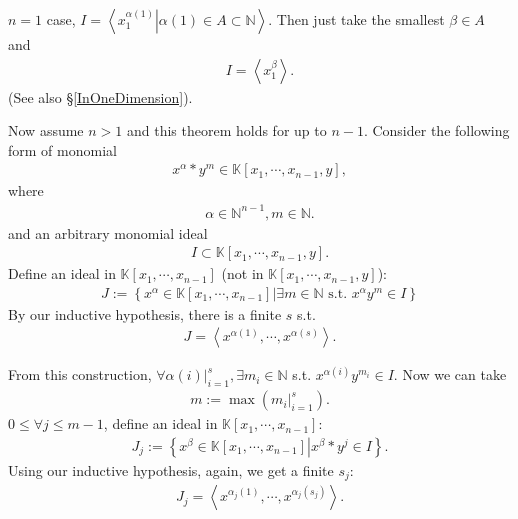 \documentclass[11pt]{book}
\begin{document}
$n=1$ case, $I = \left<\left. x_1^{\alpha(1)} \right| {\alpha(1)} \in A \subset \mathbb{N} \right>$.
Then just take the smallest $\beta \in A$ and 
\begin{eqnarray}
I = \left< x_1^\beta \right>.
\end{eqnarray}
(See also \S\ref{InOneDimension}).

Now assume $n>1$ and this theorem holds for up to $n-1$.
Consider the following form of monomial
\begin{eqnarray}
x^\alpha * y^m \in \mathbb{K}[x_1, \cdots, x_{n-1},y],
\end{eqnarray}
where
\begin{eqnarray}
\alpha \in \mathbb{N}^{n-1}, m \in \mathbb{N}.
\end{eqnarray}
and an arbitrary monomial ideal
\begin{eqnarray}
I \subset \mathbb{K}[x_1, \cdots, x_{n-1},y].
\end{eqnarray}
Define an ideal in $\mathbb{K}[x_1, \cdots, x_{n-1}]$ (not in $\mathbb{K}[x_1, \cdots, x_{n-1}, y]$):
\begin{eqnarray}
J := \left\{ \left. x^\alpha \in \mathbb{K}[x_1, \cdots, x_{n-1}] \right| \exists m \in \mathbb{N} \text{ s.t. } x^\alpha y^m \in I \right\}
\end{eqnarray}
By our inductive hypothesis, there is a finite $s$ s.t.
\begin{eqnarray}
J = \left<x^{\alpha(1)}, \cdots, x^{\alpha(s)} \right>.
\end{eqnarray}

From this construction, $\forall \left. \alpha(i) \right|_{i=1}^s, \exists m_i \in \mathbb{N}$ s.t. $x^{\alpha(i)} y^{m_i} \in I$.
Now we can take 
\begin{eqnarray}
m := \max\left(\left. m_i \right|_{i=1}^s \right).
\end{eqnarray}
$0 \leq \forall j \leq m-1$, define an ideal in $\mathbb{K}[x_1, \cdots, x_{n-1}]$:
\begin{eqnarray}
J_j := \left\{ \left. x^\beta \in \mathbb{K}[x_1, \cdots, x_{n-1}] \right| x^\beta * y^j \in I \right\}.
\end{eqnarray}
Using our inductive hypothesis, again, we get a finite $s_j$:
\begin{eqnarray}
J_j =  \left<x^{\alpha_j(1)}, \cdots, x^{\alpha_j(s_j)} \right>.
\end{eqnarray}
\end{document}
